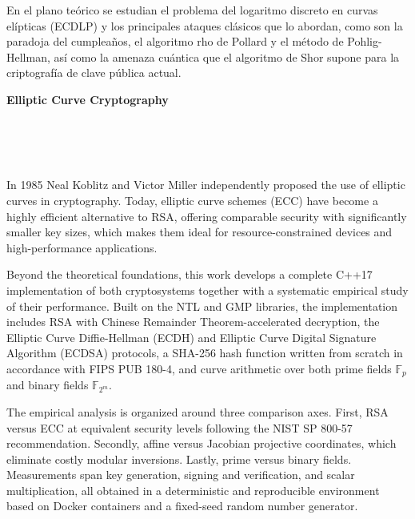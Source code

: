 En el plano teórico se estudian el problema del logaritmo discreto en curvas elípticas (ECDLP) y los principales ataques clásicos que lo abordan, como son la paradoja del cumpleaños, el algoritmo rho de Pollard y el método de Pohlig-Hellman, así como la amenaza cuántica que el algoritmo de Shor supone para la criptografía de clave pública actual.

\cleardoublepage


\thispagestyle{empty}


\begin{center}
{\large\bfseries Elliptic Curve Cryptography}\\
\end{center}
\begin{center}
\myName\\
\end{center}

\\

\vspace{0.7cm}
\\
In 1985 Neal Koblitz and Victor Miller independently proposed the use of elliptic curves in cryptography. Today, elliptic curve schemes (ECC) have become a highly efficient alternative to RSA, offering comparable security with significantly smaller key sizes, which makes them ideal for resource-constrained devices and high-performance applications.

Beyond the theoretical foundations, this work develops a complete C++17 implementation of both cryptosystems together with a systematic empirical study of their performance. Built on the NTL and GMP libraries, the implementation includes RSA with Chinese Remainder Theorem-accelerated decryption, the Elliptic Curve Diffie-Hellman (ECDH) and Elliptic Curve Digital Signature Algorithm (ECDSA) protocols, a SHA-256 hash function written from scratch in accordance with FIPS PUB 180-4, and curve arithmetic over both prime fields $\mathbb{F}_p$ and binary fields $\mathbb{F}_{2^m}$.

The empirical analysis is organized around three comparison axes. First, RSA versus ECC at equivalent security levels following the NIST SP 800-57 recommendation. Secondly, affine versus Jacobian projective coordinates, which eliminate costly modular inversions. Lastly, prime versus binary fields. Measurements span key generation, signing and verification, and scalar multiplication, all obtained in a deterministic and reproducible environment based on Docker containers and a fixed-seed random number generator.

